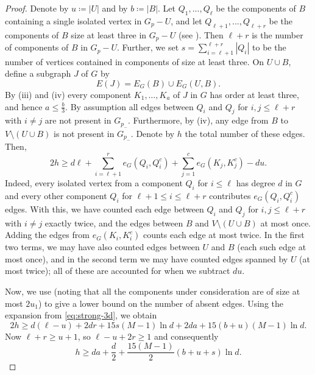 \documentclass[notitlepage]{scrartcl}
\begin{document}
\begin{proof}
Denote by $u\coloneqq |U|$ and by $b\coloneqq |B|$. Let $Q_1,...,Q_{\ell}$ be the components of $B$ containing a single isolated vertex in $G_p-U$, and let $Q_{\ell+1},..., Q_{\ell+r}$ be the components of $B$ size at least three in $G_p-U$ (see ). Then $\ell+r$ is the number of components of $B$ in $G_p-U$. Further, we set $s=\sum_{i=\ell+1}^{\ell+r} |Q_i|$ to be the number of vertices contained in components of size at least three.
On $U\cup B$, define a subgraph $J$ of $G$ by
\[
 E(J)=E_G(B)\cup E_G(U,B).
\]
By (iii) and (iv) every component $K_1,\ldots,K_a$ of $J$ in $G$ has order at least three, and hence $a\le \frac{b}{3}$. 
By assumption all edges between $Q_i$ and $Q_j$ for $i, j \leq \ell+r$ with $i \neq j$ are not present in $G_{p_-}$. Furthermore, by (iv), any edge from $B$ to $V\setminus (U \cup B)$ is not present in $G_{p_-}$. Denote by $h$ the total number of these edges. Then,
\begin{equation*}\label{eq:small-components-key}
 2h \ge d\ell+\sum_{i=\ell+1}^r e_G(Q_i,Q_i^c)+\sum_{j=1}^c e_G(K_j,K_j^c)-du.
\end{equation*}
Indeed, every isolated vertex from a component $Q_i$ for $i \leq \ell$ has degree $d$ in $G$ and every other component $Q_i$ for $\ell+1 \leq i \leq \ell+r$ contributes $e_G(Q_i, Q_i^c)$ edges. With this, we have counted each edge between $Q_i$ and $Q_j$ for $i,j\leq \ell+r$ with $i\neq j$ exactly twice, and the edges between $B$ and $V\setminus (U\cup B)$ at most once. 
Adding the edges from $e_G(K_i, K_i^c)$ counts each edge at most twice. In the first two terms, we may have also counted edges between $U$ and $B$ (each such edge at most once), and in the second term we may have counted edges spanned by $U$ (at most twice); all of these are accounted for when we subtract  $du$.  

Now, we use  (noting that all the components under consideration are of size at most $2u_1$) to give a lower bound on the number of absent edges. Using the expansion from \eqref{eq:strong-3d}, we obtain
\[
2h \geq d(\ell-u) + 2dr + 15 s (M-1) \ln d+2da+ 15 (b+u)(M-1) \ln d.
\]
Now $\ell+r \geq u+1$, so $\ell-u+2r \geq 1$ and consequently
\[
h \geq da + \frac{d}{2}+\frac{15(M-1)}{2} (b+u+s) \ln d.
\]


\end{proof}
\end{document}
